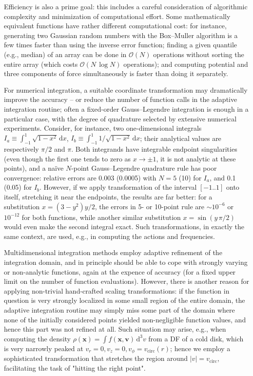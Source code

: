 \documentclass[12pt]{article}
\renewcommand{\d}{\mathrm{d}}
\newcommand{\bv}{\boldsymbol{v}}
\newcommand{\bx}{\boldsymbol{x}}
\begin{document}
Efficiency is also a prime goal: this includes a careful consideration of algorithmic complexity and minimization of computational effort. Some mathematically equivalent functions have rather different computational cost: for instance, generating two Gaussian random numbers with the Box--Muller algorithm is a few times faster than using the inverse error function; finding a given quantile (e.g., median) of an array can be done in $\mathcal{O}(N)$ operations without sorting the entire array (which costs $\mathcal{O}(N\,\log N)$ operations); and computing potential and three components of force simultaneously is faster than doing it separately.

For numerical integration, a suitable coordinate transformation may dramatically improve the accuracy -- or reduce the number of function calls in the adaptive integration routine; often a fixed-order Gauss--Legendre integration is enough in a particular case, with the degree of quadrature selected by extensive numerical experiments.
Consider, for instance, two one-dimensional integrals $I_a \equiv \int_{-1}^1 \sqrt{1-x^2}\,\d x$,
$I_b \equiv \int_{-1}^1 1/\sqrt{1-x^2}\,\d x$; their analytical values are respectively $\pi/2$ and $\pi$. Both integrands have integrable endpoint singularities (even though the first one tends to zero as $x\to \pm 1$, it is not analytic at these points), and a na\"ive $N$-point Gauss--Legendre quadrature rule has poor convergence: relative errors are 0.003 (0.0005) with $N=5$ (10) for $I_a$, and 0.1 (0.05) for $I_b$. However, if we apply transformation of the interval $[-1..1]$ onto itself, stretching it near the endpoints, the results are far better: for a substitution $x = (3-y^2)y/2$, the errors in 5- or 10-point rule are $\sim10^{-6}$ or $10^{-12}$ for both functions, while another similar substitution $x = \sin(y\,\pi/2)$ would even make the second integral exact. Such transformations, in exactly the same context, are used, e.g., in computing the actions and frequencies.

Multidimensional integration methods employ adaptive refinement of the integration domain, and in principle should be able to cope with strongly varying or non-analytic functions, again at the expence of accuracy (for a fixed upper limit on the number of function evaluations). However, there is another reason for applying non-trivial hand-crafted scaling transformations: if the function in question is very strongly localized in some small region of the entire domain, the adaptive integration routine may simply miss some part of the domain where none of the initially considered points yielded non-negligible function values, and hence this part was not refined at all. Such situation may arise, e.g., when computing the density $\rho(\bx) = \int f(\bx,\bv)\,\d ^3v$ from a DF of a cold disk, which is very narrowly peaked at $v_r=0, v_z=0, v_\phi=v_\mathrm{circ}(r)$; hence we employ a sophisticated transformation that stretches the region around $|v| = v_\mathrm{circ}$, facilitating the task of "hitting the right point".
\end{document}
